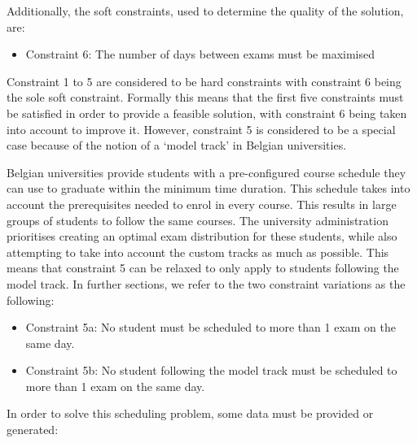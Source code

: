 Additionally, the soft constraints, used to determine the quality of the solution, are:
\begin{itemize}
    \item Constraint 6: The number of days between exams must be maximised
\end{itemize}
Constraint 1 to 5 are considered to be hard constraints with constraint 6 being the sole soft constraint. Formally this means that the first five constraints must be satisfied in order to provide a feasible solution, with constraint 6 being taken into account to improve it. However, constraint 5 is considered to be a special case because of the notion of a ‘model track’ in Belgian universities.

Belgian universities provide students with a pre-configured course schedule they can use to graduate within the minimum time duration. This schedule takes into account the prerequisites needed to enrol in every course. This results in large groups of students to follow the same courses. The university administration prioritises creating an optimal exam distribution for these students, while also attempting to take into account the custom tracks as much as possible. This means that constraint 5 can be relaxed to only apply to students following the model track. In further sections, we refer to the two constraint variations as the following:
\begin{itemize}
    \item Constraint 5a: No student must be scheduled to more than 1 exam on the same day.
    \item Constraint 5b: No student following the model track must be scheduled to more than 1 exam on the same day.

\end{itemize}

In order to solve this scheduling problem, some data must be provided or generated:


